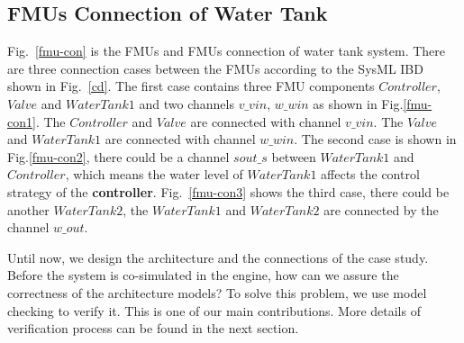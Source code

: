 \subsection{FMUs Connection of Water Tank}
Fig.~\ref{fmu-con} is the FMUs and FMUs connection of water tank system. There are three connection cases between the FMUs according to the SysML IBD shown in Fig.~\ref{cd}. The first case contains three FMU components $Controller$, $Valve$ and $WaterTank1$ and two channels $v \_ vin$, $w \_ win$ as shown in Fig.\ref{fmu-con1}. The $Controller$ and $Valve$ are connected with channel $v \_ vin$. The $Valve$ and $WaterTank1$ are connected with channel $w \_ win$. The second case is shown in Fig.\ref{fmu-con2}, there could be a channel $sout \_ s$ between $WaterTank1$ and $Controller$, which means the water level of $WaterTank1$ affects the control strategy of the \textbf{controller}. Fig.~\ref{fmu-con3} shows the third case, there could be another $WaterTank2$, the $WaterTank1$ and $WaterTank2$ are connected by the channel $w \_ out$. 
\begin{figure}[htbp]
\end{figure}

Until now, we design the architecture and the connections of the case study. Before the system is co-simulated in the engine, how can we assure the correctness of the architecture models? To solve this problem, we use model checking to verify it. This is one of our main contributions. More details of verification process can be found in the next section.